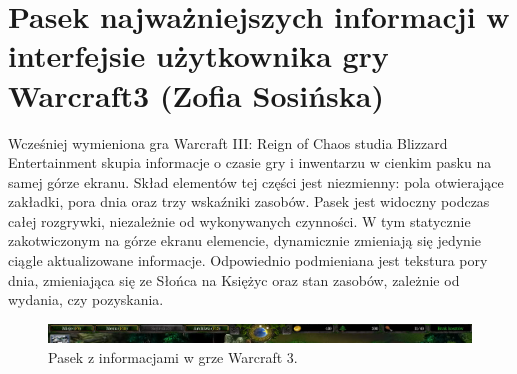 \section{Pasek najważniejszych informacji w interfejsie użytkownika gry Warcraft3 (Zofia Sosińska)}
Wcześniej wymieniona gra Warcraft III: Reign of Chaos studia Blizzard Entertainment skupia informacje o czasie gry i inwentarzu w cienkim pasku na samej górze ekranu.
Skład elementów tej części jest niezmienny: pola otwierające zakładki, pora dnia oraz trzy wskaźniki zasobów. Pasek jest widoczny
podczas całej rozgrywki, niezależnie od wykonywanych czynności. W tym statycznie zakotwiczonym na górze ekranu elemencie, dynamicznie
zmieniają się jedynie ciągle aktualizowane informacje. Odpowiednio podmieniana jest tekstura pory dnia, zmieniająca się ze Słońca
na Księżyc oraz stan zasobów, zależnie od wydania, czy pozyskania.


\begin{figure}[htbp]
    \centering
    \includegraphics[width=1.0\textwidth]{images/ui/warcraft3_gorny_pasek.png}
    \caption{Pasek z informacjami w grze Warcraft 3.}\label{fig:Warcraft3}
\end{figure}